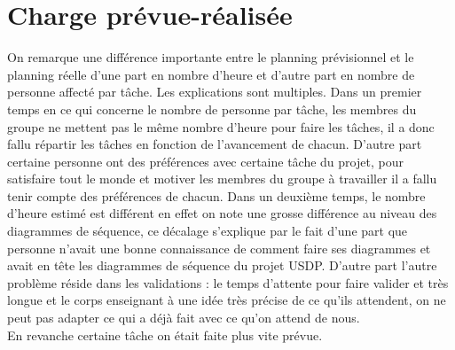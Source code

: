 \section {Charge prévue-réalisée}


On remarque une différence importante entre le planning prévisionnel et le planning réelle d'une part en nombre d'heure et d'autre part en nombre de personne affecté par tâche. Les explications sont multiples. Dans un premier temps en ce qui concerne le nombre de personne par tâche, les membres du groupe ne mettent pas le même nombre d'heure pour faire les tâches, il a donc fallu répartir les tâches en fonction de l'avancement de chacun. D'autre part certaine personne ont des préférences avec certaine tâche du projet, pour satisfaire tout le monde et motiver les membres du groupe à travailler il a fallu tenir compte des préférences de chacun. Dans un deuxième temps, le nombre d'heure estimé est différent en effet on note une grosse différence au niveau des diagrammes de séquence, ce décalage s'explique par le fait d'une part que personne n'avait une bonne connaissance de comment faire ses diagrammes et avait en tête les diagrammes de séquence du projet USDP. D'autre part l'autre problème réside dans les validations : le temps d'attente pour faire valider et très longue et le corps enseignant à une idée très précise de ce qu'ils attendent, on ne peut pas adapter ce qui a déjà fait avec ce qu'on attend de nous. \\
En revanche certaine tâche on était faite plus vite prévue.